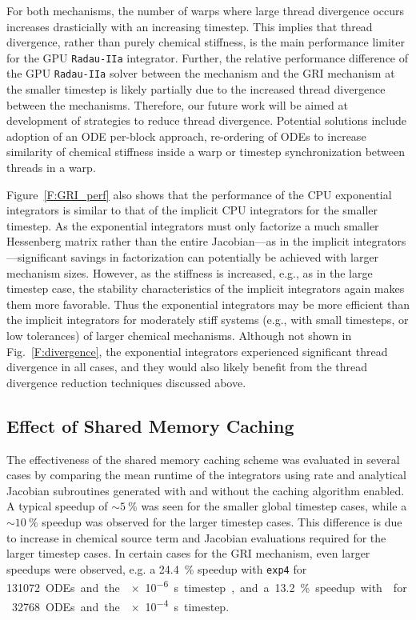 \documentclass[preprint]{elsarticle}
\begin{document}
For both mechanisms, the number of warps where large thread divergence occurs increases drasticially with an increasing timestep.
This implies that thread divergence, rather than purely chemical stiffness, is the main performance limiter for the GPU \texttt{Radau-IIa} integrator.
Further, the relative performance difference of the GPU \texttt{Radau-IIa} solver between the  mechanism and the GRI mechanism at the smaller timestep is likely partially due to the increased thread divergence between the mechanisms.
Therefore, our future work will be aimed at development of strategies to reduce thread divergence.
Potential solutions include adoption of an ODE per-block approach, re-ordering of ODEs to increase similarity of chemical stiffness inside a warp or timestep synchronization between threads in a warp.

Figure~\ref{F:GRI_perf} also shows that the performance of the CPU exponential integrators is similar to that of the implicit CPU integrators for the smaller timestep.
As the exponential integrators must only factorize a much smaller Hessenberg matrix rather than the entire Jacobian---as in the implicit integrators---significant savings in factorization can potentially be achieved with larger mechanism sizes.
However, as the stiffness is increased, e.g., as in the large timestep case, the stability characteristics of the implicit integrators again makes them more favorable.
Thus the exponential integrators may be more efficient than the implicit integrators for moderately stiff systems (e.g., with small timesteps, or low tolerances) of larger chemical mechanisms.
Although not shown in Fig.~\ref{F:divergence}, the exponential integrators experienced significant thread divergence in all cases, and they would also likely benefit from the thread divergence reduction techniques discussed above.

\subsection{Effect of Shared Memory Caching}
\label{S:smem}
The effectiveness of the shared memory caching scheme was evaluated in several cases by comparing the mean runtime of the integrators using rate and analytical Jacobian subroutines generated with and without the caching algorithm enabled.
A typical speedup of $\sim\SI{5}{\percent}$ was seen for the smaller global timestep cases, while a $\sim\SI{10}{\percent}$ speedup was observed for the larger timestep cases.
This difference is due to increase in chemical source term and Jacobian evaluations required for the larger timestep cases.
In certain cases for the GRI mechanism, even larger speedups were observed, e.g. a \SI{24.4}{\percent} speedup with \texttt{exp4} for \SI{131072} ODEs and the \SI{e-6}{\s} timestep, and a \SI{13.2}{\percent} speedup with  for \SI{32768} ODEs and the \SI{e-4}{\s} timestep.
\end{document}
